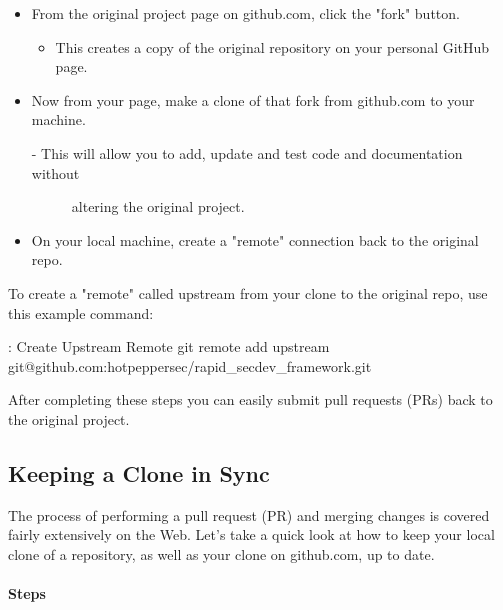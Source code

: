 \begin{itemize}
      \item
            From the original project page on github.com, click the "fork" button.

            \begin{itemize}

                  \item
                        This creates a copy of the original repository on your personal
                        GitHub page.
            \end{itemize}
      \item
            Now from your page, make a clone of that fork from github.com to your
            machine.

            \begin{description}
                  \item[- This will allow you to add, update and test code and
                        documentation without]
                        altering the original project.
            \end{description}
      \item
            On your local machine, create a "remote" connection back to the
            original repo.
\end{itemize}

To create a "remote" called upstream from your clone to the original
repo, use this example command:

\begin{mybox}{\thetcbcounter: Create Upstream Remote}
      git remote add upstream git@github.com:hotpeppersec/rapid\_secdev\_framework.git
\end{mybox}

After completing these steps you can easily submit pull requests (PRs)
back to the original project.

\hypertarget{keeping-a-clone-in-sync}{%
      \subsection{Keeping a Clone in Sync}\label{keeping-a-clone-in-sync}}

\justify
The process of performing a pull request (PR) and merging changes is
covered fairly extensively on the Web. Let's take a quick look at how to
keep your local clone of a repository, as well as your clone on
github.com, up to date.

\hypertarget{steps-1}{%
      \paragraph{Steps}\label{steps-1}}

